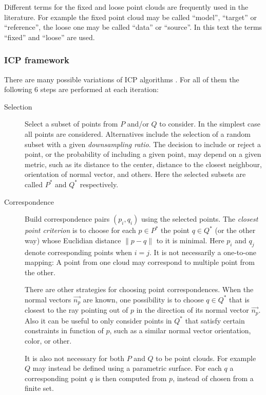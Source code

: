 Different terms for the fixed and loose point clouds are frequently used in the literature. For example the fixed point cloud may be called ``model'', ``target'' or ``reference'', the loose one may be called ``data'' or ``source''. In this text the terms ``fixed'' and ``loose'' are used.

\subsubsection{ICP framework}
There are many possible variations of ICP algorithms \cite{Rusi2001}. For all of them the following 6 steps are performed at each iteration:
\begin{description}
\item[Selection] Select a subset of points from $P$ and/or $Q$ to consider. In the simplest case all points are considered. Alternatives include the selection of a random subset with a given \emph{downsampling ratio}. The decision to include or reject a point, or the probability of including a given point, may depend on a given metric, such as its distance to the center, distance to the closest neighbour, orientation of normal vector, and others. Here the selected subsets are called $P^*$ and $Q^*$ respectively.
\item[Correspondence] Build correspondence pairs $(p_i, q_i)$ using the selected points. The \emph{closest point criterion} is to choose for each $p \in P^*$ the point $q \in Q^*$ (or the other way) whose Euclidian distance $\|p - q\|$ to it is minimal. Here $p_i$ and $q_j$ denote corresponding points when $i = j$. It is not necessarily a one-to-one mapping: A point from one cloud may correspond to multiple point from the other.

There are other strategies for choosing point correspondences. When the normal vectors $\vec{n_p}$ are known, one possibility is to choose $q \in Q^*$ that is closest to the ray pointing out of $p$ in the direction of its normal vector $\vec{n_p}$. Also it can be useful to only consider points in $Q^*$ that satisfy certain constraints in function of $p$, such as a similar normal vector orientation, color, or other.

It is also not necessary for both $P$ and $Q$ to be point clouds. For example $Q$ may instead be defined using a parametric surface. For each $q$ a corresponding point $q$ is then computed from $p$, instead of chosen from a finite set.


\end{description}
